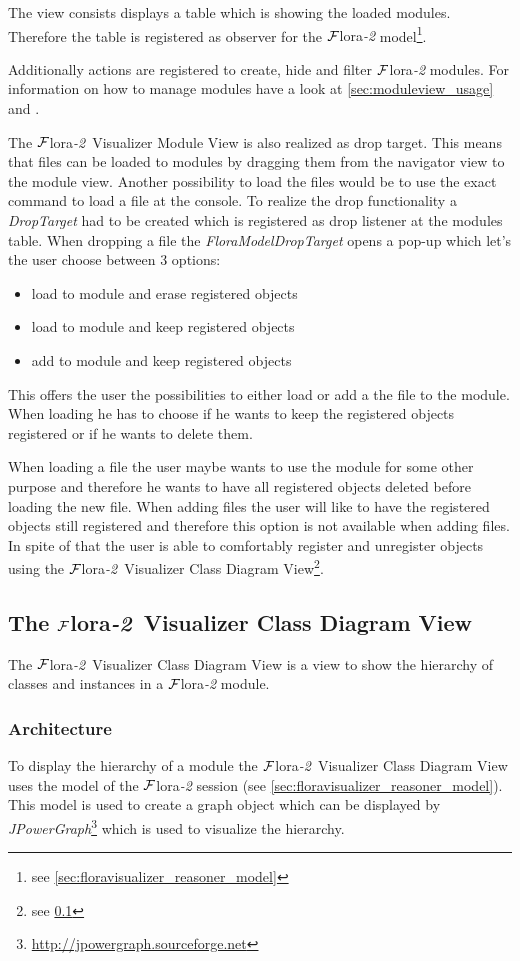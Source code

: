 \documentclass[a4paper,11pt]{article}
\newcommand{\FLORA}{{\mbox{\sc ${\cal F}${lora}\rm\emph{-2}}}\xspace}
\newcommand{\FVIZ}{{\mbox{\sc ${\cal F}${lora}\rm\emph{-2} {Visualizer}}}\xspace}
\begin{document}
The view consists displays a table which is showing the loaded modules.
Therefore the table is registered as observer for the \FLORA
model\footnote{see \ref{sec:floravisualizer_reasoner_model}}.

Additionally actions are registered to create, hide and
filter \FLORA modules. For information on how to manage modules
have a look at \ref{sec:moduleview_usage} and \cite{flora-manual}.

The \FVIZ Module View is also realized as drop target. This means
that files can be loaded to modules by dragging them from the navigator
view to the module view. Another possibility to load the files would
be to use the exact command to load a file at the console.
To realize the drop functionality a \emph{DropTarget} had to be created which
is registered as drop listener at the modules table. When dropping
a file the \emph{FloraModelDropTarget} opens a pop-up which
let's the user choose between 3 options:
\begin{itemize}
  \item load to module and erase registered objects
  \item load to module and keep registered objects
  \item add to module and keep registered objects
\end{itemize}
This offers the user the possibilities to either load or add a
the file to the module. When loading he has to choose if he
wants to keep the registered objects registered or if he wants
to delete them.

When loading a file the user maybe wants to use the module for
some other purpose and therefore he wants to have all registered
objects deleted before loading the new file.
When adding files the user will like to have the registered objects
still registered and therefore this option is not available when
adding files.
In spite of that the user is able to comfortably register and 
unregister objects using the \FVIZ Class Diagram View\footnote{
see \ref{sec:floravisualizer_classdiagramview}}.

\subsection{The \FVIZ Class Diagram View}
\label{sec:floravisualizer_classdiagramview}
The \FVIZ Class Diagram View is a view to show the hierarchy of
classes and instances in a \FLORA module.

\subsubsection{Architecture}
\label{sec:floravisualizer_classdiagramview_architecture}
To display the hierarchy of a module the \FVIZ Class Diagram View
uses the model of the \FLORA session
(see \ref{sec:floravisualizer_reasoner_model}).
This model is used to create a graph object which can be displayed by
\emph{JPowerGraph}\footnote{
\url{http://jpowergraph.sourceforge.net}}
which is used to visualize the hierarchy.
\end{document}
